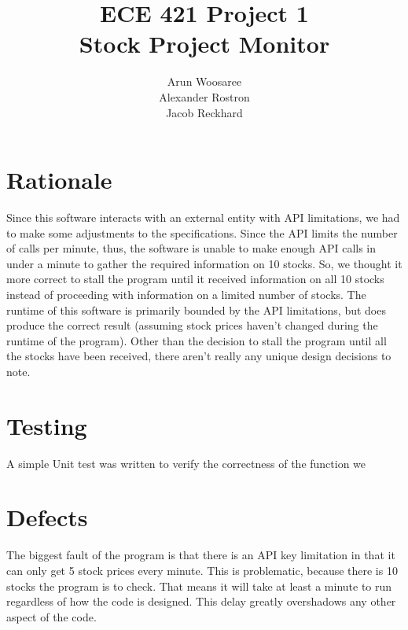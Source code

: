 \documentclass[letterpaper]{article}
\title{ECE 421 Project 1\\
Stock Project Monitor}
\author{Arun Woosaree\\
Alexander Rostron\\
Jacob Reckhard
}
\begin{document}
\maketitle %

\section{Rationale}
Since this software interacts with an external entity with API limitations, we
had to make some adjustments to the specifications. Since the API limits the
number of calls per minute, thus, the software is unable to make enough API
calls in under a minute to gather the required information on 10 stocks. So,
we thought it more correct to stall the program until it received information
on all 10 stocks instead of proceeding with information on a limited number of
stocks. The runtime of this software is primarily bounded by the API
limitations, but does produce the correct result (assuming stock prices
haven't changed during the runtime of the program). Other than the decision to
stall the program until all the stocks have been received, there aren't really
any unique design decisions to note.

\section{Testing}
A simple Unit test was written to verify the correctness of the function we

\section{Defects}

The biggest fault of the program is that there is an API key limitation in that
it can only get 5 stock prices every minute. This is problematic, because there
is 10 stocks the program is to check. That means it will take at least a minute
to run regardless of how the code is designed. This delay greatly overshadows
any other aspect of the code.
\end{document}
